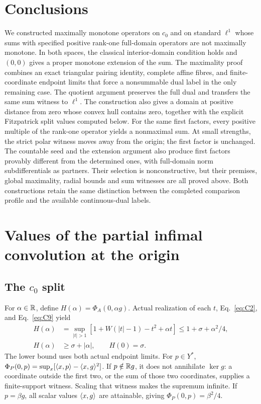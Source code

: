 \section{Conclusions}
\label{sec:conclusion}

We constructed maximally monotone operators on $c_0$ and on standard
$\ell^1$ whose sums with specified positive rank-one full-domain
operators are not maximally monotone. In both spaces, the classical
interior-domain condition holds and $(0,0)$ gives a proper monotone
extension of the sum. The maximality proof combines an exact triangular
pairing identity, complete affine fibres, and finite-coordinate endpoint
limits that force a nonsummable dual label in the only remaining case.
The quotient argument preserves the full dual and transfers the same
sum witness to $\ell^1$. The construction also gives a domain at
positive distance from zero whose convex hull contains zero, together
with the explicit Fitzpatrick split values computed below.
For the same first factors, every positive multiple of the rank-one
operator yields a nonmaximal sum. At small strengths, the strict polar
witness moves away from the origin; the first factor is unchanged.
The countable seed and the extension argument also produce first factors
provably different from the determined ones, with full-domain norm
subdifferentials as partners. Their selection is nonconstructive, but
their premises, global maximality, radial bounds and sum witnesses are
all proved above. Both constructions retain the same distinction between
the completed comparison profile and the available continuous-dual labels.



\appendix
\section{Values of the partial infimal convolution at the origin}
\label{sec:split}
\subsection{The $c_0$ split}
\label{sec:C7}
For $\alpha\in\mathbb R$, define $H(\alpha)=\Phi_A(0,\alpha g)$.
Actual realization of each $t$, Eq.~\eqref{eq:C2}, and
Eq.~\eqref{eq:C9} yield
\begin{equation}
\begin{aligned}
H(\alpha)&=\sup_{|t|>1}[1+W(|t|-1)-t^2+\alpha t]
 \le1+\sigma+\alpha^2/4,\\
H(\alpha)&\ge\sigma+|\alpha|,\qquad H(0)=\sigma.
\end{aligned}
\tag{C12}\label{eq:C12}
\end{equation}
The lower bound uses both actual endpoint limits. For $p\in Y^*$,
$\Phi_P(0,p)=\sup_x[\langle x,p\rangle-\langle x,g\rangle^2]$.
If $p\notin\mathbb R g$, it does not annihilate $\ker g$: a coordinate outside
the first two, or the sum of those two coordinates, supplies a
finite-support witness. Scaling that witness makes the supremum infinite.
If $p=\beta g$, all scalar values $\langle x,g\rangle$ are attainable, giving
$\Phi_P(0,p)=\beta^2/4$.

